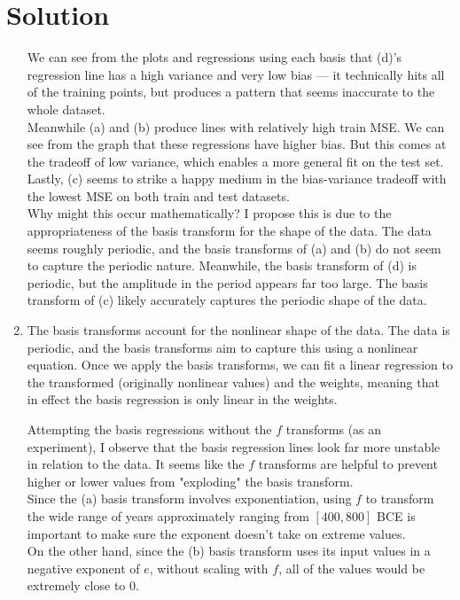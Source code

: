\documentclass[submit]{harvardml}
\newenvironment{solution}
  {\color{blue}\section*{Solution}}
{}
\begin{document}
\begin{solution}
\begin{enumerate}
    We can see from the plots and regressions using each basis that (d)'s regression line has a high variance and very low bias — it technically hits all of the training points, but produces a pattern that seems inaccurate to the whole dataset.\\

    Meanwhile (a) and (b) produce lines with relatively high train MSE. We can see from the graph that these regressions have higher bias. But this comes at the tradeoff of low variance, which enables a more general fit on the test set.\\

    Lastly, (c) seems to strike a happy medium in the bias-variance tradeoff with the lowest MSE on both train and test datasets.\\

    Why might this occur mathematically? I propose this is due to the appropriateness of the basis transform for the shape of the data. The data seems roughly periodic, and the basis transforms of (a) and (b) do not seem to capture the periodic nature. Meanwhile, the basis transform of (d) is periodic, but the amplitude in the period appears far too large. The basis transform of (c) likely accurately captures the periodic shape of the data.
    
    \item The basis transforms account for the nonlinear shape of the data. The data is periodic, and the basis transforms aim to capture this using a nonlinear equation. Once we apply the basis transforms, we can fit a linear regression to the transformed (originally nonlinear values) and the weights, meaning that in effect the basis regression is only linear in the weights.
    
    \iffalse Attempting the basis regressions without the $f$ transforms (as an experiment), I observe that the basis regression lines look far more unstable in relation to the data. It seems like the $f$ transforms are helpful to prevent higher or lower values from "exploding" the basis transform. \\
    
    Since the (a) basis transform involves exponentiation, using $f$ to transform the wide range of years approximately ranging from $[400,800]$ BCE is important to make sure the exponent doesn't take on extreme values.\\

    On the other hand, since the (b) basis transform uses its input values in a negative exponent of $e$, without scaling with $f$, all of the values would be extremely close to 0.\\


\end{enumerate}
\end{solution}
\end{document}
